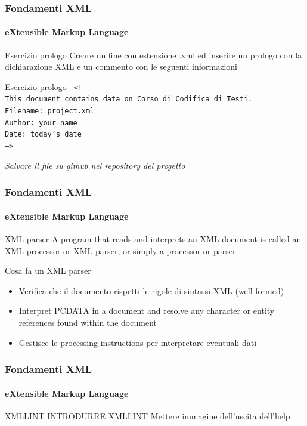 \begin{frame}
	\frametitle{Fondamenti XML}
	\framesubtitle{eXtensible Markup Language}
	\addtocounter{nframe}{1}

	\begin{block}{Esercizio prologo}
		Creare un fine con estensione .xml ed inserire un prologo con la dichiarazione XML e un commento con le seguenti informazioni
	\end{block}

	\begin{block}{Esercizio prologo}
		\texttt{
		 <!--
		 \\This document contains data on Corso di Codifica di Testi.
		 \\Filename: project.xml
		 \\Author: your name
		 \\Date: today's date
		 \\-->
		}
	\end{block}

	\textit{Salvare il file su github nel repository del progetto}

\end{frame}

\begin{frame}
	\frametitle{Fondamenti XML}
	\framesubtitle{eXtensible Markup Language}
	\addtocounter{nframe}{1}

	\begin{block}{XML parser}
		A program that reads and interprets an XML document is called an XML processor or XML parser, or simply a processor or parser.
	\end{block}
	\begin{block}{Cosa fa un XML parser}
		\begin{itemize}
			\item Verifica che il documento rispetti le rigole di sintassi XML (well-formed)
			\item Interpret PCDATA in a document and resolve any character or entity references found within the document
			\item Gestisce le processing instructions per interpretare eventuali dati
		\end{itemize}
	\end{block}

\end{frame}

\begin{frame}
	\frametitle{Fondamenti XML}
	\framesubtitle{eXtensible Markup Language}
	\addtocounter{nframe}{1}

	\begin{block}{XMLLINT}
		INTRODURRE XMLLINT
		Mettere immagine dell'uscita dell'help
	\end{block}

\end{frame}


